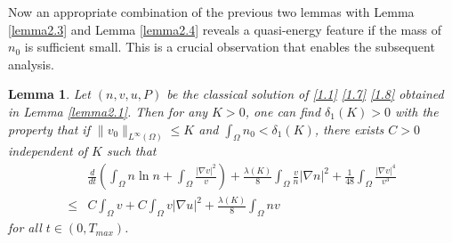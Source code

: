 \documentclass[12pt]{article}
\theoremstyle{plain}
\newtheorem{lemma}{Lemma}[section]
\theoremstyle{definition}
\numberwithin{equation}{section}
\begin{document}
Now an appropriate combination of the previous two lemmas with Lemma \ref{lemma2.3} and Lemma \ref{lemma2.4} reveals a
quasi-energy feature if the mass of $n_0$ is sufficient small. This is a crucial observation that enables the subsequent analysis.
\begin{lemma}\label{lemma3.3}
	Let $(n,v,u,P)$ be the  classical solution of \eqref{1.1} \eqref{1.7} \eqref{1.8} obtained in Lemma \ref{lemma2.1}.
Then for any $K>0$, one can find $\delta_1(K)>0 $  with the property that  if  $\|v_{0}\|_{L^{\infty}(\Omega)}\leq K$ and  $\int_\Omega n_0<\delta_1(K)$, there exists $C>0$  independent of $K$ such that
 \begin{equation}\label{3.10}
\begin{split}
&\frac d{dt} (\int_\Omega n\ln n+\int_\Omega  \frac{|\nabla v|^2}v)+
\frac{\lambda(K)} 8\int_\Omega\frac{v}{n}|\nabla n|^2+
\frac1{48}
\int_\Omega \frac{|\nabla v|^4}{v^3}
\\
\leq &
C\int_{\Omega}v+ C\int_\Omega v |\nabla u|^2
+\frac{\lambda(K)}8\int_\Omega nv
\end{split}
\end{equation}
for all $t\in(0,T_{max})$.
 \end{lemma}
\end{document}
